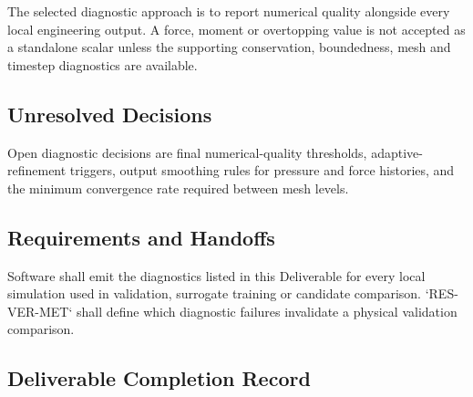 
The selected diagnostic approach is to report numerical quality
alongside every local engineering output. A force, moment or
overtopping value is not accepted as a standalone scalar unless the
supporting conservation, boundedness, mesh and timestep diagnostics are
available.

\subsection{Unresolved Decisions}
\label{sec:res-num-err-unresolved-decisions}


Open diagnostic decisions are final numerical-quality thresholds,
adaptive-refinement triggers, output smoothing rules for pressure and
force histories, and the minimum convergence rate required between
mesh levels.

\subsection{Requirements and Handoffs}
\label{sec:res-num-err-requirements}


Software shall emit the diagnostics listed in this Deliverable for
every local simulation used in validation, surrogate training or
candidate comparison. `RES-VER-MET` shall define which diagnostic
failures invalidate a physical validation comparison.

\subsection{Deliverable Completion Record}
\label{sec:res-num-err-completion-record}

%
%
%
